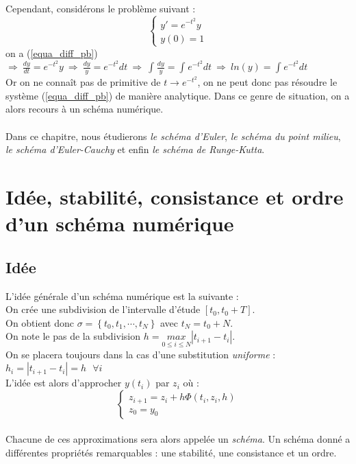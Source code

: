 \documentclass[a4paper,10pt]{report}
\begin{document}
\indent Cependant, considérons le problème suivant :
\begin{equation}
\label{equa_diff_pb}
\left\lbrace
\begin{array}{l}
y'=e^{-t^2}y \\
y(0)=1
\end{array}\right.
\end{equation}
on a (\ref{equa_diff_pb}) $\Rightarrow \ \frac{dy}{dt} = e^{-t^2}y \ \Rightarrow \ \frac{dy}{y} = e^{-t^2}dt \ \Rightarrow \ \int_{}^{} \frac{dy}{y} = \int_{}^{} e^{-t^2}dt \ \Rightarrow \ ln(y) = \int_{}^{} e^{-t^2}dt $\\
Or on ne connaît pas de primitive de $t \longrightarrow e^{-t^2}$, on ne peut donc pas résoudre le système (\ref{equa_diff_pb}) de manière analytique. Dans ce genre de situation, on a alors recours à un schéma numérique.\\ \\
\indent Dans ce chapitre, nous étudierons \textit{le schéma d'Euler}, \textit{le schéma du point milieu}, \textit{le schéma d'Euler-Cauchy} et enfin \textit{le schéma de Runge-Kutta}.

\newpage
\section{Idée, stabilité, consistance et ordre d'un schéma numérique}
\subsection{Idée}
L'idée générale d'un schéma numérique est la suivante :\\
On crée une subdivision de l'intervalle d'étude $[t_0,t_0+T]$.\\
On obtient donc $\sigma = \left\lbrace t_0,t_1,\cdots ,t_N \right\rbrace$ avec $t_N=t_0+N$.\\
On note le pas de la subdivision $h=\underset{0\leq i \leq N}{max} |t_{i+1}-t_i|$.\\
On se placera toujours dans la cas d'une substitution \textit{uniforme} : $h_i=|t_{i+1}-t_i|=h \ \ \ \forall i$\\
L'idée est alors d'approcher $y(t_i)$ par $z_i$ où :
\begin{equation}
\left\lbrace
\begin{array}{l}
z_{i+1}=z_i+h\Phi (t_i,z_i,h) \\
z_0=y_0
\end{array}\right.
\end{equation}\\
Chacune de ces approximations sera alors appelée un \textit{schéma}. Un schéma donné a différentes propriétés remarquables : une stabilité, une consistance et un ordre.
\end{document}
